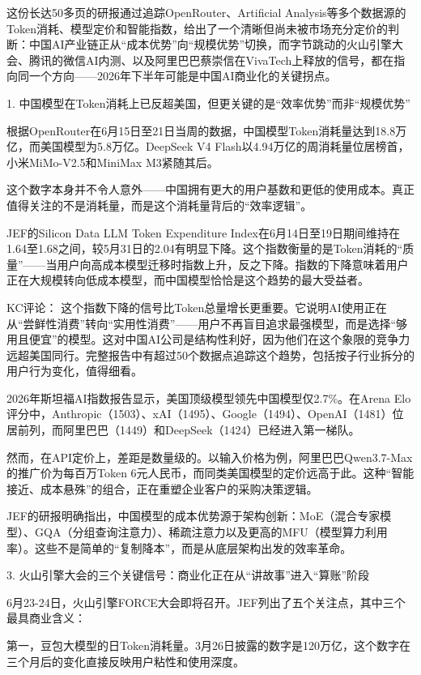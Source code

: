 \documentclass[11pt]{ctexart}
\begin{document}
这份长达50多页的研报通过追踪OpenRouter、Artificial Analysis等多个数据源的Token消耗、模型定价和智能指数，给出了一个清晰但尚未被市场充分定价的判断：中国AI产业链正从“成本优势”向“规模优势”切换，而字节跳动的火山引擎大会、腾讯的微信AI内测、以及阿里巴巴蔡崇信在VivaTech上释放的信号，都在指向同一个方向——2026年下半年可能是中国AI商业化的关键拐点。

1. 中国模型在Token消耗上已反超美国，但更关键的是“效率优势”而非“规模优势”

根据OpenRouter在6月15日至21日当周的数据，中国模型Token消耗量达到18.8万亿，而美国模型为5.8万亿。DeepSeek V4 Flash以4.94万亿的周消耗量位居榜首，小米MiMo-V2.5和MiniMax M3紧随其后。

这个数字本身并不令人意外——中国拥有更大的用户基数和更低的使用成本。真正值得关注的不是消耗量，而是这个消耗量背后的“效率逻辑”。

JEF的Silicon Data LLM Token Expenditure Index在6月14日至19日期间维持在1.64至1.68之间，较5月31日的2.04有明显下降。这个指数衡量的是Token消耗的“质量”——当用户向高成本模型迁移时指数上升，反之下降。指数的下降意味着用户正在大规模转向低成本模型，而中国模型恰恰是这个趋势的最大受益者。

KC评论： 这个指数下降的信号比Token总量增长更重要。它说明AI使用正在从“尝鲜性消费”转向“实用性消费”——用户不再盲目追求最强模型，而是选择“够用且便宜”的模型。这对中国AI公司是结构性利好，因为他们在这个象限的竞争力远超美国同行。完整报告中有超过50个数据点追踪这个趋势，包括按子行业拆分的用户行为变化，值得细看。

2026年斯坦福AI指数报告显示，美国顶级模型领先中国模型仅2.7\%。在Arena Elo评分中，Anthropic（1503）、xAI（1495）、Google（1494）、OpenAI（1481）位居前列，而阿里巴巴（1449）和DeepSeek（1424）已经进入第一梯队。

然而，在API定价上，差距是数量级的。以输入价格为例，阿里巴巴Qwen3.7-Max的推广价为每百万Token 6元人民币，而同类美国模型的定价远高于此。这种“智能接近、成本悬殊”的组合，正在重塑企业客户的采购决策逻辑。

JEF的研报明确指出，中国模型的成本优势源于架构创新：MoE（混合专家模型）、GQA（分组查询注意力）、稀疏注意力以及更高的MFU（模型算力利用率）。这些不是简单的“复制降本”，而是从底层架构出发的效率革命。

3. 火山引擎大会的三个关键信号：商业化正在从“讲故事”进入“算账”阶段

6月23-24日，火山引擎FORCE大会即将召开。JEF列出了五个关注点，其中三个最具商业含义：

第一，豆包大模型的日Token消耗量。3月26日披露的数字是120万亿，这个数字在三个月后的变化直接反映用户粘性和使用深度。
\end{document}

